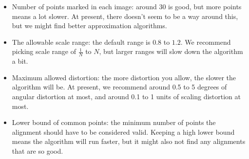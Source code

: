 \documentclass[a4paper, oneside]{memoir}
\begin{document}
\begin{itemize}
	\item Number of points marked in each image: around 30 is good, but more points means
		a lot slower. At present, there doesn't seem to be a way around this, but we might find
		better approximation algorithms.
	\item The allowable scale range: the default range is $0.8$ to $1.2$. We recommend
		picking scale range of $\frac{1}{N}$ to $N$, but larger ranges will slow down the
		algorithm a bit.
	\item Maximum allowed distortion: the more distortion you allow, the slower the
		algorithm will be. At present, we recommend around 0.5 to 5 degrees of angular
		distortion at most, and around 0.1 to 1 units of scaling distortion at most.
	\item Lower bound of common points: the minimum number of points the alignment should
		have to be considered valid. Keeping a high lower bound means the algorithm will
		run faster, but it might also not find any alignments that are so good. 
\end{itemize}



\newpage
\nocite{*}

\end{document}
